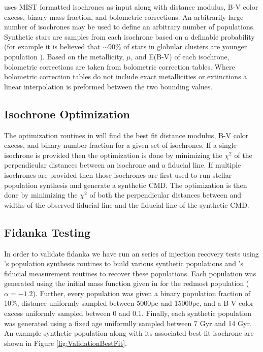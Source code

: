 \fidanka uses MIST formatted isochrones \citep{Dotter2016} as input along
with distance modulus, B-V color excess, binary mass fraction, and bolometric
corrections. An arbitrarily large number of isochrones may be used to define an
arbitrary number of populations. Synthetic stars are samples from each
isochrone based on a definable probability (for example it is believed that
$\sim90\%$ of stars in globular clusters are younger population
\citep[e.g.][]{Suntzeff1996, Carretta2013}). Based on the metallicity, $\mu$, and E(B-V) of each
isochrone, bolometric corrections are taken from bolometric correction tables.
Where bolometric correction tables do not include exact metallicities or
extinctions a linear interpolation is preformed between the two bounding
values. 

\subsection{Isochrone Optimization}
The optimization routines in \fidanka will find the best fit distance modulus,
B-V color excess, and binary number fraction for a given set of isochrones. If
a single isochrone is provided then the optimization is done by minimizing the
$\chi^2$ of the perpendicular distances between an isochrone and a fiducial
line. If multiple isochrones are provided then those isochrones are first used
to run stellar population synthesis and generate a synthetic CMD. The
optimization is then done by minimizing the $\chi^2$ of both the perpendicular
distances between and widths of the observed fiducial line and the fiducial
line of the synthetic CMD.


\subsection{Fidanka Testing}
In order to validate fidanka we have run an series of injection recovery tests
using \fidanka's population synthesis routines to build various synthetic
populations and \fidanka's fiducial measurement routines to recover these
populations. Each population was generated using the initial mass function
given in \citep{Milone2012} for the redmost population ($\alpha=-1.2$).
Further, every population was given a binary population fraction of 10\%,
distance uniformly sampled between 5000pc and 15000pc, and a B-V color excess
uniformly sampled between 0 and 0.1. Finally, each synthetic population was
generated using a fixed age  uniformlly sampled between 7 Gyr and 14 Gyr. An
example synthetic population along with its associated best fit isochrone are
shown in Figure \ref{fig:ValidationBestFit}.

